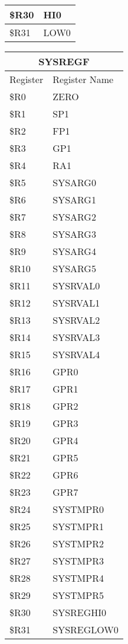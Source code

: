 \documentclass[letterpaper, 11pt]{article}
\begin{document}
\begin{figure}[!h]
{\begin{tabular}{|l|l|}
			\$R30 & HI0  \\ \hline
			\$R31 & LOW0  \\ \hline
		\end{tabular}
	}
	\hfill
	\parbox{0.5\linewidth}{
		\centering\fontsize{6}{8}\selectfont
		\fontsize{6}{8}\selectfont
		\begin{tabular}{|l|l|}
			\hline
			\multicolumn{2}{|c|}{SYSREGF} \\
			\hline
			Register & Register Name \\ \hline
			\$R0  & ZERO \\ 	\hline
			\$R1  & SP1 \\ 	\hline
			\$R2  & FP1 \\ 	\hline
			\$R3  & GP1 \\ 	\hline
			\$R4  & RA1 \\ 	\hline
			\$R5  & SYSARG0 \\ 	\hline
			\$R6  & SYSARG1 \\ 	\hline
			\$R7  & SYSARG2 \\ 	\hline
			\$R8  & SYSARG3 \\ 	\hline
			\$R9  & SYSARG4 \\ 	\hline
			\$R10 & SYSARG5 \\ \hline
			\$R11 & SYSRVAL0  \\ \hline
			\$R12 & SYSRVAL1  \\ \hline
			\$R13 & SYSRVAL2  \\ \hline
			\$R14 & SYSRVAL3  \\ \hline
			\$R15 & SYSRVAL4  \\ \hline
			\$R16 & GPR0  \\ \hline
			\$R17 & GPR1  \\ \hline
			\$R18 & GPR2  \\ \hline
			\$R19 & GPR3  \\ \hline
			\$R20 & GPR4  \\ \hline
			\$R21 & GPR5  \\ \hline
			\$R22 & GPR6  \\ \hline
			\$R23 & GPR7  \\ \hline
			\$R24 & SYSTMPR0  \\ \hline
			\$R25 & SYSTMPR1  \\ \hline
			\$R26 & SYSTMPR2  \\ \hline
			\$R27 & SYSTMPR3  \\ \hline
			\$R28 & SYSTMPR4  \\ \hline
			\$R29 & SYSTMPR5  \\ \hline
			\$R30 & SYSREGHI0  \\ \hline
			\$R31 & SYSREGLOW0  \\ \hline
		\end{tabular}
	}
\end{figure}
\end{document}
